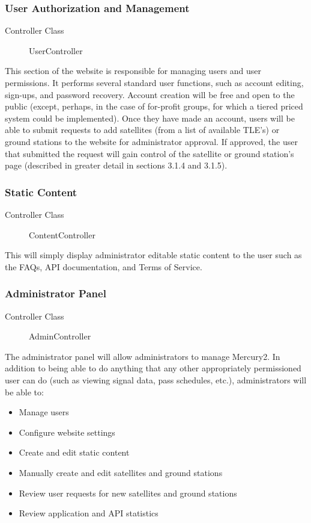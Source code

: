 \documentclass{mxl-note}
\begin{document}
\subsubsection{User Authorization and Management}
\begin{description}
	\item [Controller Class]UserController
\end{description}
This section of the website is responsible for managing users and user permissions. It performs several standard user functions, such as account editing, sign-ups, and password recovery. Account creation will be free and open to the public (except, perhaps, in the case of for-profit groups, for which a tiered priced system could be implemented). Once they have made an account, users will be able to submit requests to add satellites (from a list of available TLE's) or ground stations to the website for administrator approval. If approved, the user that submitted the request will gain control of the satellite or ground station's page (described in greater detail in sections 3.1.4 and 3.1.5).

\subsubsection{Static Content}
\begin{description}
	\item [Controller Class]ContentController
\end{description}
This will simply display administrator editable static content to the user such as the FAQs, API documentation, and Terms of Service.

\subsubsection{Administrator Panel}
\begin{description}
	\item [Controller Class]AdminController
\end{description}
The administrator panel will allow administrators to manage Mercury2. In addition to being able to do anything that any other appropriately permissioned user can do (such as viewing signal data, pass schedules, etc.), administrators will be able to:
\begin{itemize}
	\item Manage users
	\item Configure website settings
	\item Create and edit static content
	\item Manually create and edit satellites and ground stations 
	\item Review user requests for new satellites and ground stations
	\item Review application and API statistics
\end{itemize}
\end{document}
